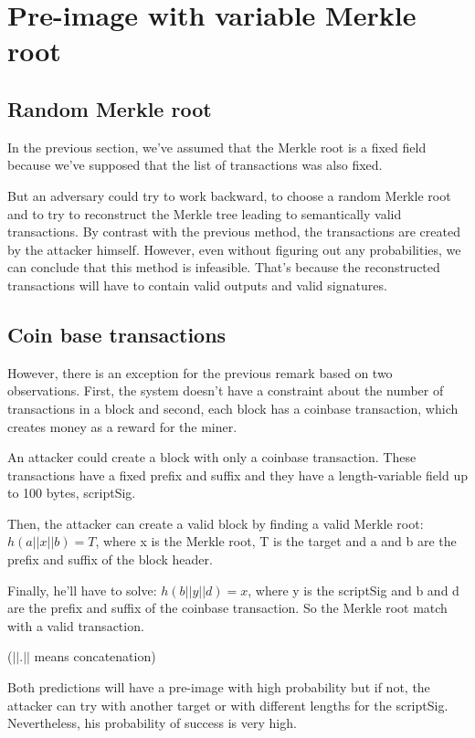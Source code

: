 \section{Pre-image with variable Merkle root}

  \subsection{Random Merkle root}

In the previous section, we've assumed that the Merkle root is a fixed field because we've supposed that the list of transactions was also fixed. \newline

But an adversary could try to work backward, to choose a random Merkle root and to try to reconstruct the Merkle tree leading to semantically valid transactions. By contrast with the previous method, the transactions are created by the attacker himself. However, even without figuring out any probabilities, we can conclude that this method is infeasible. That's because the reconstructed transactions will have to contain valid outputs and valid signatures.

  \subsection{Coin base transactions}

However, there is an exception for the previous remark based on two observations. First, the system doesn't have a constraint about the number of transactions in a block and second, each block has a coinbase transaction, which creates money as a reward for the miner. \newline

An attacker could create a block with only a coinbase transaction. These transactions have a fixed prefix and suffix and they have a length-variable field up to 100 bytes, scriptSig.

Then, the attacker can create a valid block by finding a valid Merkle root: $h(a || x || b) = T$, where x is the Merkle root, T is the target and a and b are the prefix and suffix of the block header.

Finally, he'll have to solve: $h(b || y || d) = x$, where y is the scriptSig and b and d are the prefix and suffix of the coinbase transaction. So the Merkle root match with a valid transaction.

($|| . ||$ means concatenation)\newline

Both predictions will have a pre-image with high probability but if not, the attacker can try with another target or with different lengths for the scriptSig. Nevertheless, his probability of success is very high.
